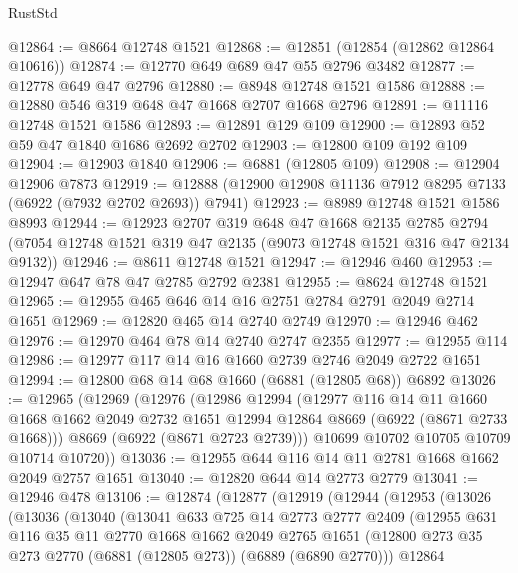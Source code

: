 \begin{lexlean}{RustStd}
\begin{coremodule}
@12864 := @8664 @12748 @1521
@12868 := @12851 (@12854 (@12862 @12864 @10616))
@12874 := @12770 @649 @689 @47 @55 @2796 @3482
@12877 := @12778 @649 @47 @2796
@12880 := @8948 @12748 @1521 @1586
@12888 := @12880 @546 @319 @648 @47 @1668 @2707 @1668 @2796
@12891 := @11116 @12748 @1521 @1586
@12893 := @12891 @129 @109
@12900 := @12893 @52 @59 @47 @1840 @1686 @2692 @2702
@12903 := @12800 @109 @192 @109
@12904 := @12903 @1840
@12906 := @6881 (@12805 @109)
@12908 := @12904 @12906 @7873
@12919 := @12888 (@12900 @12908 @11136 @7912 @8295 @7133 (@6922 (@7932 @2702 @2693)) @7941)
@12923 := @8989 @12748 @1521 @1586 @8993
@12944 := @12923
    @2707
    @319
    @648
    @47
    @1668
    @2135
    @2785
    @2794
    (@7054 @12748 @1521 @319 @47 @2135 (@9073 @12748 @1521 @316 @47 @2134 @9132))
@12946 := @8611 @12748 @1521
@12947 := @12946 @460
@12953 := @12947 @647 @78 @47 @2785 @2792 @2381
@12955 := @8624 @12748 @1521
@12965 := @12955 @465 @646 @14 @16 @2751 @2784 @2791 @2049 @2714 @1651
@12969 := @12820 @465 @14 @2740 @2749
@12970 := @12946 @462
@12976 := @12970 @464 @78 @14 @2740 @2747 @2355
@12977 := @12955 @114
@12986 := @12977 @117 @14 @16 @1660 @2739 @2746 @2049 @2722 @1651
@12994 := @12800 @68 @14 @68 @1660 (@6881 (@12805 @68)) @6892
@13026 := @12965
    (@12969
      (@12976
        (@12986
          @12994
          (@12977
            @116
            @14
            @11
            @1660
            @1668
            @1662
            @2049
            @2732
            @1651
            @12994
            @12864
            @8669
            (@6922 (@8671 @2733 @1668)))
          @8669
          (@6922 (@8671 @2723 @2739)))
        @10699
        @10702
        @10705
        @10709
        @10714
        @10720))
@13036 := @12955 @644 @116 @14 @11 @2781 @1668 @1662 @2049 @2757 @1651
@13040 := @12820 @644 @14 @2773 @2779
@13041 := @12946 @478
@13106 := @12874
    (@12877
      (@12919
        (@12944
          (@12953
            (@13026
              (@13036
                (@13040
                  (@13041
                    @633
                    @725
                    @14
                    @2773
                    @2777
                    @2409
                    (@12955
                      @631
                      @116
                      @35
                      @11
                      @2770
                      @1668
                      @1662
                      @2049
                      @2765
                      @1651
                      (@12800 @273 @35 @273 @2770 (@6881 (@12805 @273)) (@6889 (@6890 @2770)))
                      @12864

\end{coremodule}
\end{lexlean}
